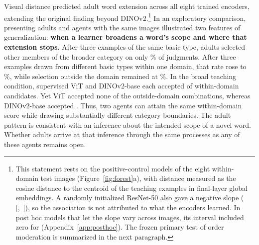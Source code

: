 \documentclass[11pt]{article}
\begin{document}
Visual distance predicted adult word extension across all eight trained encoders, extending the original finding beyond DINOv2.\footnote{This statement rests on the positive-control models of the eight within-domain test images (Figure~\ref{fig:forest}a), with distance measured as the cosine distance to the centroid of the teaching examples in final-layer global embeddings. A randomly initialized ResNet-50 also gave a negative slope (\VtPcRandB{} [\VtPcRandLo,~\VtPcRandHi]), so the association is not attributed to what the encoders learned. In post hoc models that let the slope vary across images, its interval included zero for \VcImgTrInclList{} (Appendix~\ref{app:posthoc}). The frozen primary test of order moderation is summarized in the next paragraph.} In an exploratory comparison, presenting adults and agents with the same images illustrated two features of generalization: \textbf{when a learner broadens a word’s scope and where that extension stops}. After three examples of the same basic type, adults selected other members of the broader category on only \VtXSameBasicPct\% of judgments. After three examples drawn from different basic types within one domain, that rate rose to \VtXBroadPct\%, while selection outside the domain remained at \VtXOutBroadPct\%. In the broad teaching condition, supervised ViT and DINOv2-base each accepted \VtXViTIn{} of \VtXInN{} within-domain candidates. Yet ViT accepted none of the \VtXOutN{} outside-domain combinations, whereas DINOv2-base accepted \VtXDinoBOut. Thus, two agents can attain the same within-domain score while drawing substantially different category boundaries. The adult pattern is consistent with an inference about the intended scope of a novel word. Whether adults arrive at that inference through the same processes as any of these agents remains open.
\end{document}
